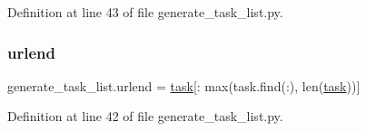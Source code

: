 Definition at line 43 of file generate\+\_\+task\+\_\+list.\+py.

\mbox{\label{namespacegenerate__task__list_a32a1426d61e9e5475d58bdb9db0d22ab}} 
\subsubsection{\texorpdfstring{urlend}{urlend}}
{\footnotesize\ttfamily generate\+\_\+task\+\_\+list.\+urlend = \hyperlink{namespacegenerate__task__list_a6a85e730374a68f9195f2e0e4fc09a9a}{task}\mbox{[}\+: max(task.\+find(\textquotesingle{}\+:\textquotesingle{}), len(\hyperlink{namespacegenerate__task__list_a6a85e730374a68f9195f2e0e4fc09a9a}{task}))\mbox{]}}



Definition at line 42 of file generate\+\_\+task\+\_\+list.\+py.

